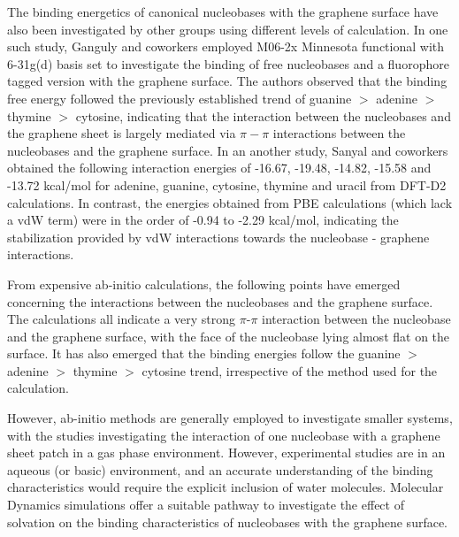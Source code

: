 The binding energetics of canonical nucleobases with the graphene surface have also been investigated by other groups using different levels of calculation.\supercite{panigrahi_interaction_2012,cortes-arriagada_intermolecular_2021,cortes-arriagada_phosphorene_2018,le_physisorption_2012} In one such study, Ganguly and coworkers employed M06-2x Minnesota functional with 6-31g(d) basis set to investigate the binding of free nucleobases and a fluorophore tagged version with the graphene surface\supercite{bhai_probing_2020}. The authors observed that the binding free energy followed the previously established trend of guanine $>$ adenine $>$ thymine $>$ cytosine, indicating that the interaction between the nucleobases and the graphene sheet is largely mediated via $\pi-\pi$ interactions between the nucleobases and the graphene surface. In an another study, Sanyal and coworkers obtained the following interaction energies of -16.67, -19.48, -14.82, -15.58 and -13.72 kcal/mol for adenine, guanine, cytosine, thymine and uracil from DFT-D2 calculations.\supercite{vovusha_adsorption_2015} In contrast, the energies obtained from PBE calculations (which lack a vdW term) were in the order of -0.94 to -2.29 kcal/mol, indicating the stabilization provided by vdW interactions towards the nucleobase - graphene interactions.

From expensive ab-initio calculations, the following points have emerged concerning the interactions between the nucleobases and the graphene surface\supercite{cho_noncovalent_2013,antony_structures_2008,umadevi_quantum_2011,vovusha_adsorption_2015,bhai_probing_2020,lee_physisorption_2013,le_physisorption_2012,panigrahi_interaction_2012,cortes-arriagada_intermolecular_2021,cortes-arriagada_phosphorene_2018}. The calculations all indicate a very strong $\pi$-$\pi$ interaction between the nucleobase and the graphene surface, with the face of the nucleobase lying almost flat on the surface. It has also emerged that the binding energies follow the guanine $>$ adenine $>$ thymine $>$ cytosine trend, irrespective of the method used for the calculation.

However, ab-initio methods are generally employed to investigate smaller systems, with the studies investigating the interaction of one nucleobase with a graphene sheet patch in a gas phase environment. However, experimental studies are in an aqueous (or basic) environment, and an accurate understanding of the binding characteristics would require the explicit inclusion of water molecules. Molecular Dynamics simulations offer a suitable pathway to investigate the effect of solvation on the binding characteristics of nucleobases with the graphene surface.

